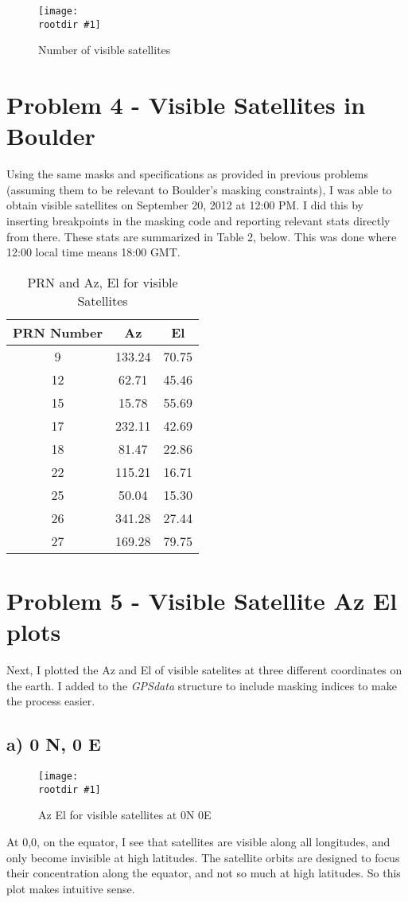 \documentclass[12pt,a4paper,oneside]{article}
\newcommand{\rootdir}{./Figures/}
\newcommand{\figH}[3]{
			\begin{figure}[H]
				\centering
				\texttt{[image: \\rootdir \#1]}
				\caption{#2}
				\label{#3}
			\end{figure}
			}
\begin{document}
\figH{NumVisSats.png}{Number of visible satellites}{fig:numvissats}

\section{Problem 4 - Visible Satellites in Boulder}
Using the same masks and specifications as provided in previous problems (assuming them to be relevant to Boulder's masking constraints), I was able to obtain visible satellites on September 20, 2012 at 12:00 PM. I did this by inserting breakpoints in the masking code and reporting relevant stats directly from there. These stats are summarized in Table 2, below. This was done where 12:00 local time means 18:00 GMT.
\begin{table}[H]
	\centering
	\begin{tabular}{|c|c|c|}
		\hline
		\textbf{PRN Number} &	\textbf{Az} & \textbf{El}	 \\\hline
		    9&     133.24& 70.75\\\hline
		    12&     62.71& 45.46\\\hline
		    15&     15.78& 55.69\\\hline
		    17&     232.11& 42.69\\\hline
		    18&     81.47& 22.86\\\hline
	     	    22&     115.21& 16.71\\\hline
		    25&     50.04& 15.30\\\hline
		    26&     341.28& 27.44\\\hline
		    27&     169.28& 79.75\\\hline
	\end{tabular}
	\caption{PRN and Az, El for visible Satellites}
\end{table}

\section{Problem 5 - Visible Satellite Az El plots}
Next, I plotted the Az and El of visible satelites at three different coordinates on the earth. I added to the \emph{GPSdata} structure to include masking indices to make the process easier. 

\subsection{a) 0 N, 0 E}
\figH{VisAzEl0-0.eps}{Az El for visible satellites at 0N 0E}{fig:AzEl00}
At 0,0, on the equator, I see that satellites are visible along all longitudes, and only become invisible at high latitudes. The satellite orbits are designed to focus their concentration along the equator, and not so much at high latitudes. So this plot makes intuitive sense. 
\end{document}

